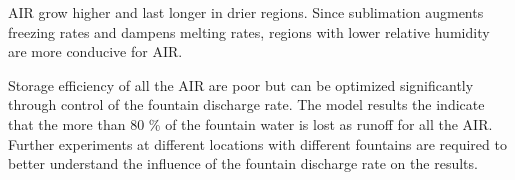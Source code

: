 \documentclass[utf8]{frontiersSCNS} %
\begin{document}
AIR grow higher and last longer in drier regions. Since sublimation augments freezing rates and dampens melting
rates, regions with lower relative humidity are more conducive for AIR.

Storage efficiency of all the AIR are poor but can be optimized significantly through control of the fountain discharge
rate.  The model results the indicate that the more than 80 \% of the fountain water is lost as runoff for all the AIR.
Further experiments at different locations with different fountains are required to better understand the influence of
the fountain discharge rate on the results.



\end{document}
